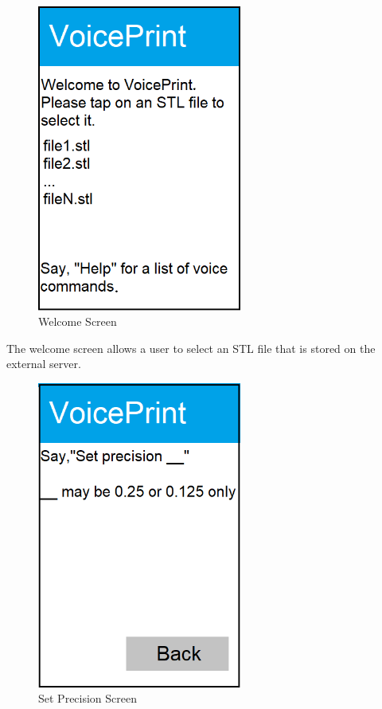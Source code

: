 \begin{figure}[h!]
	\centering
   	\includegraphics[width=0.60\textwidth]{images/Activity1.png}
   	\caption{Welcome Screen}
\end{figure}

The welcome screen allows a user to select an STL file that is stored on the external server.

\newpage

\begin{figure}[h!]
	\centering
   	\includegraphics[width=0.60\textwidth]{images/Activity2.png}
   	\caption{Set Precision Screen}
\end{figure}

